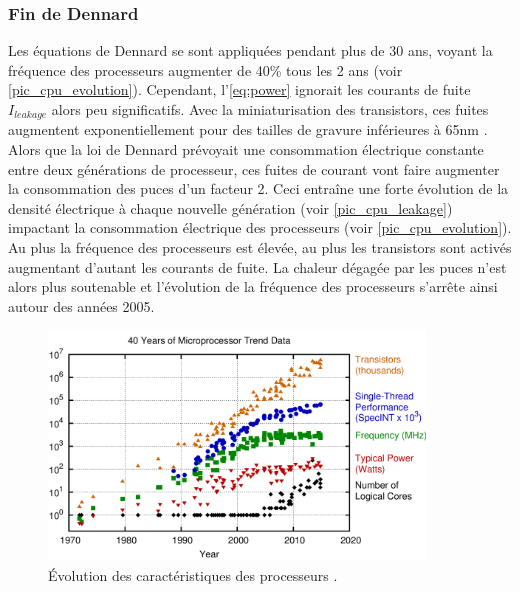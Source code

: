         
        




    \subsubsection{Fin de Dennard}

        Les équations de Dennard se sont appliquées pendant plus de 30 ans, voyant la fréquence des processeurs augmenter de 40\% tous les 2 ans (voir \autoref{pic_cpu_evolution}). Cependant, l'\autoref{eq:power} ignorait les courants de fuite $I_{leakage}$ alors peu significatifs. Avec la miniaturisation des transistors, ces fuites augmentent exponentiellement pour des tailles de gravure inférieures à 65nm \cite{martin2014post}. Alors que la loi de Dennard prévoyait une consommation électrique constante entre deux générations de processeur, ces fuites de courant vont faire augmenter la consommation des puces d'un facteur 2. Ceci entraîne une forte évolution de la densité électrique à chaque nouvelle génération (voir \autoref{pic_cpu_leakage}) impactant la consommation électrique des processeurs (voir \autoref{pic_cpu_evolution}). Au plus la fréquence des processeurs est élevée, au plus les transistors sont activés augmentant d'autant les courants de fuite. La chaleur dégagée par les puces n'est alors plus soutenable et l'évolution de la fréquence des processeurs s'arrête ainsi autour des années 2005.
        
        \begin{figure}
            \center
            \includegraphics[width=10cm]{images/cpu_evolution.png}
            \caption{\label{pic_cpu_evolution} Évolution des caractéristiques des processeurs \cite{rupp40years}.}
        \end{figure}
        
